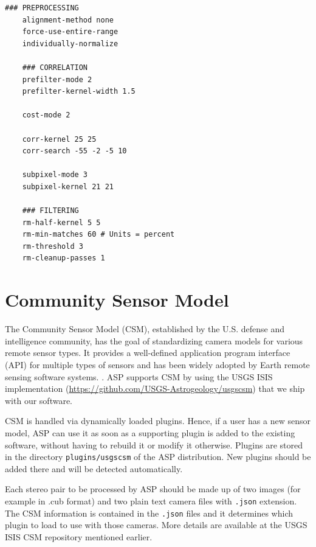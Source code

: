 \begin{center}\begin{minipage}{5.5in}
\begin{Verbatim}[frame=single,fontsize=\small,label=stereo.default for Cassini ISS]
    ### PREPROCESSING
    alignment-method none
    force-use-entire-range
    individually-normalize

    ### CORRELATION
    prefilter-mode 2
    prefilter-kernel-width 1.5

    cost-mode 2

    corr-kernel 25 25
    corr-search -55 -2 -5 10

    subpixel-mode 3
    subpixel-kernel 21 21

    ### FILTERING
    rm-half-kernel 5 5
    rm-min-matches 60 # Units = percent
    rm-threshold 3
    rm-cleanup-passes 1

\end{Verbatim}
\end{minipage}\end{center}

\section{ Community Sensor Model}
\label{sec:csm}

The Community Sensor Model (CSM), established by the U.S. defense and
intelligence community, has the goal of standardizing camera models for
various remote sensor types. It provides a well-defined application
program interface (API) for multiple types of sensors and has been
widely adopted by Earth remote sensing software systems.
\citep{hare2017community}. ASP supports CSM by using the USGS
ISIS implementation (\url{https://github.com/USGS-Astrogeology/usgscsm})
that we ship with our software. 

CSM is handled via dynamically loaded plugins. 
Hence, if a user has a new sensor model, ASP can use it as soon as a supporting
plugin is added to the existing software, without having to rebuild it or
modify it otherwise. Plugins are stored in the directory \texttt{plugins/usgscsm}
of the ASP distribution. New plugins should be added there and will be detected
automatically.

Each stereo pair to be processed by ASP should be made up of two images
(for example in .cub format) and two plain text camera files with \texttt{.json}
extension.  The CSM information is contained in the \texttt{.json} files
and it determines which plugin to load to use with those cameras. 
More details are available at the USGS ISIS CSM repository mentioned earlier.

